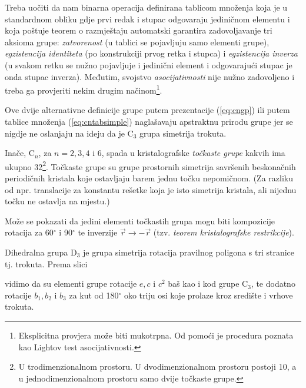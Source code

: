 Treba uočiti da nam binarna operacija definirana tablicom množenja
koja je u standardnom obliku gdje prvi redak i stupac odgovaraju
jediničnom elementu i koja poštuje teorem o razmještaju automatski 
garantira zadovoljavanje tri aksioma grupe: 
\emph{zatvorenost} (u tablici se pojavljuju samo elementi grupe),
\emph{egzistencija identiteta} (po konstrukciji prvog retka i stupca) i
\emph{egzistencija inverza} (u svakom retku se nužno pojavljuje i 
jedinični element i odgovarajući stupac je onda stupac inverza).
Međutim, svojstvo \emph{asocijativnosti} nije nužno zadovoljeno
i treba ga provjeriti nekim drugim načinom\footnote{Eksplicitna provjera
može biti mukotrpna. Od pomoći je procedura poznata kao Lightov
test asocijativnosti.}.


Ove dvije alternativne definicije grupe putem prezentacije (\ref{eq:cngp}) ili
putem tablice množenja (\ref{eq:cntabsimple}) 
naglašavaju apstraktnu prirodu grupe jer se nigdje ne oslanjaju
na ideju da je C$_3$ grupa simetrija trokuta.

Inače, C$_n$, za $n=2,3,4$ i $6$, spada u kristalografske \emph{točkaste grupe} kakvih
ima ukupno 32\footnote{U trodimenzionalnom prostoru. U dvodimenzionalnom prostoru postoji 10, a u
jednodimenzionalnom prostoru samo dvije točkaste grupe.}. 
Točkaste grupe su grupe prostornih simetrija savršenih beskonačnih
periodičnih kristala koje ostavljaju barem jednu točku nepomičnom. (Za
razliku od npr. translacije za konstantu rešetke koja je isto simetrija
kristala, ali nijednu točku ne ostavlja na mjestu.)
  
Može se pokazati da jedini elementi točkastih grupa mogu biti kompozicije
rotacija za 60$^\circ$ i 90$^\circ$ te inverzije $\vec{r}\to -\vec{r}$
(tzv. \emph{teorem kristalografske restrikcije}).
   

\begin{primjer}
    Dihedralna grupa $\mathrm{D}_3$ je grupa simetrija rotacija pravilnog poligona s tri
    stranice tj. trokuta.  Prema slici
    \begin{center}
    
    \end{center}
vidimo da su elementi grupe rotacije $e, c$ i  $c^2$ baš kao i kod grupe $\mathrm{C}_3$, te
dodatno rotacije $b_1, b_2$ i $b_3$ za kut od 180$^\circ$ oko triju osi
koje prolaze kroz središte i vrhove trokuta.
\end{primjer}

